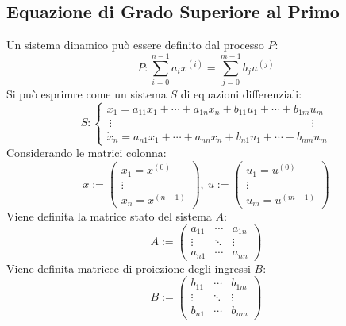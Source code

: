 \documentclass{article}
\numberwithin{equation}{subsection}
\begin{document}
\subsection{Equazione di Grado Superiore al Primo}

Un sistema dinamico può essere definito dal processo $P$:
\begin{equation}
    P:\displaystyle\sum_{i=0}^{n-1}a_ix^{(i)}=\sum_{j=0}^{m-1}b_ju^{(j)}
\end{equation}
Si può esprimre come un sistema $S$ di equazioni differenziali:
\begin{equation}
    S:
    \begin{cases}
        \dot x_1=a_{11}x_1+\cdots+a_{1n}x_n+b_{11}u_1+\cdots+b_{1m}u_m\\
        \:\vdots \qquad\qquad\qquad\qquad\qquad\qquad\qquad\qquad\qquad \vdots\\
        \dot x_n=a_{n1}x_1+\cdots+a_{nn}x_n+b_{n1}u_1+\cdots+b_{nm}u_m
    \end{cases}
\end{equation}
Considerando le matrici colonna:
\begin{equation}
    x:=
    \begin{pmatrix}
        x_1=x^{(0)}\\
        \vdots\\
        x_n=x^{(n-1)}
    \end{pmatrix}
    ,\:
    u:=
    \begin{pmatrix}
        u_1=u^{(0)}\\
        \vdots\\
        u_m=u^{(m-1)}
    \end{pmatrix}
\end{equation}
Viene definita la matrice stato del sistema $A$:
\begin{equation}
    A:=
    \begin{pmatrix}
        a_{11}& \cdots &a_{1n}\\
        \vdots & \ddots & \vdots\\
        a_{n1} & \cdots&a_{nn}
    \end{pmatrix}
\end{equation}
Viene definita matricce di proiezione degli ingressi $B$:
\begin{equation}
    B:=
    \begin{pmatrix}
        b_{11}& \cdots &b_{1m}\\
        \vdots & \ddots & \vdots\\
        b_{n1} & \cdots&b_{nm}
    \end{pmatrix}
\end{equation}
\end{document}
